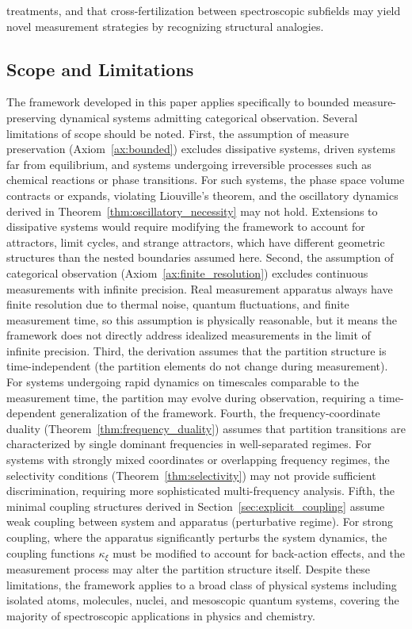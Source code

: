 \documentclass[twocolumn,10pt,a4paper]{article}
\theoremstyle{remark}
\begin{document}
treatments, and that cross-fertilization between spectroscopic subfields may yield novel measurement strategies by recognizing structural analogies.

\subsection{Scope and Limitations}

The framework developed in this paper applies specifically to bounded measure-preserving dynamical systems admitting categorical observation. Several limitations of scope should be noted. First, the assumption of measure preservation (Axiom~\ref{ax:bounded}) excludes dissipative systems, driven systems far from equilibrium, and systems undergoing irreversible processes such as chemical reactions or phase transitions. For such systems, the phase space volume contracts or expands, violating Liouville's theorem, and the oscillatory dynamics derived in Theorem~\ref{thm:oscillatory_necessity} may not hold. Extensions to dissipative systems would require modifying the framework to account for attractors, limit cycles, and strange attractors, which have different geometric structures than the nested boundaries assumed here. Second, the assumption of categorical observation (Axiom~\ref{ax:finite_resolution}) excludes continuous measurements with infinite precision. Real measurement apparatus always have finite resolution due to thermal noise, quantum fluctuations, and finite measurement time, so this assumption is physically reasonable, but it means the framework does not directly address idealized measurements in the limit of infinite precision. Third, the derivation assumes that the partition structure is time-independent (the partition elements do not change during measurement). For systems undergoing rapid dynamics on timescales comparable to the measurement time, the partition may evolve during observation, requiring a time-dependent generalization of the framework. Fourth, the frequency-coordinate duality (Theorem~\ref{thm:frequency_duality}) assumes that partition transitions are characterized by single dominant frequencies in well-separated regimes. For systems with strongly mixed coordinates or overlapping frequency regimes, the selectivity conditions (Theorem~\ref{thm:selectivity}) may not provide sufficient discrimination, requiring more sophisticated multi-frequency analysis. Fifth, the minimal coupling structures derived in Section~\ref{sec:explicit_coupling} assume weak coupling between system and apparatus (perturbative regime). For strong coupling, where the apparatus significantly perturbs the system dynamics, the coupling functions $\kappa_\xi$ must be modified to account for back-action effects, and the measurement process may alter the partition structure itself. Despite these limitations, the framework applies to a broad class of physical systems including isolated atoms, molecules, nuclei, and mesoscopic quantum systems, covering the majority of spectroscopic applications in physics and chemistry.
\end{document}
